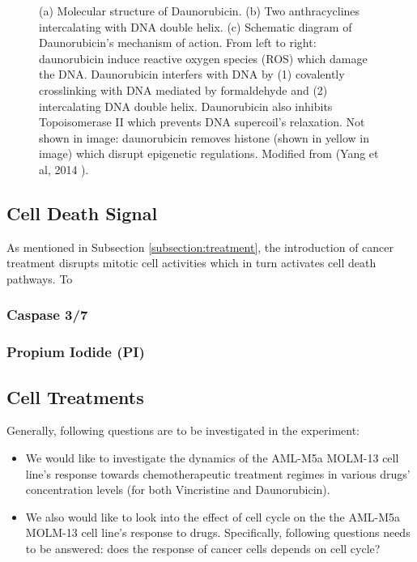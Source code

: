 \documentclass[pdftex,12pt,a4paper]{report}
\begin{document}
\begin{figure}[H]
\begin{subfigure}{.9\textwidth}
  \caption{}
  \label{fig:dauno_mechanism}
\end{subfigure}
\caption{(a) Molecular structure of Daunorubicin. (b) Two anthracyclines intercalating with DNA double helix. (c) Schematic diagram of Daunorubicin's mechanism of action. From left to right: daunorubicin induce reactive oxygen species (ROS) which damage the DNA. Daunorubicin interfers with DNA by (1) covalently crosslinking with DNA mediated by formaldehyde and (2) intercalating DNA double helix. Daunorubicin also inhibits Topoisomerase II which prevents DNA supercoil's relaxation. Not shown in image: daunorubicin removes histone (shown in yellow in image) which disrupt epigenetic regulations. Modified from (Yang et al, 2014 \cite{yang2014doxorubicin}).}
\label{fig:daunos}
\end{figure}

\subsection{Cell Death Signal}
\label{subsection:cell_death_signal}

As mentioned in Subsection \ref{subsection:treatment}, the introduction of cancer treatment disrupts mitotic cell activities which in turn activates cell death pathways. To 


\subsubsection*{Caspase 3/7}


\subsubsection*{Propium Iodide (PI)}


\subsection{Cell Treatments}
\label{subsection:cell_treatments}

Generally, following questions are to be investigated in the experiment:

\begin{itemize}
\item We would like to investigate the dynamics of the AML-M5a MOLM-13 cell line's response towards chemotherapeutic treatment regimes in various drugs' concentration levels (for both Vincristine and Daunorubicin).
\item We also would like to look into the effect of cell cycle on the the AML-M5a MOLM-13 cell line's response to drugs. Specifically, following questions needs to be answered: does the response of cancer cells depends on cell cycle?
\end{itemize}
\end{document}
